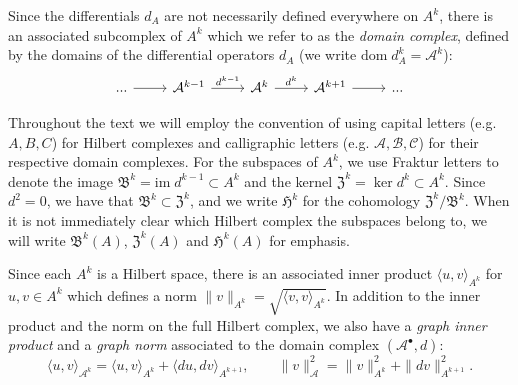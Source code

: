 \documentclass[reqno]{amsart}
\numberwithin{equation}{section}
\theoremstyle{definition}
\newcommand{\Ac}{\mathcal{A}}
\newcommand{\Bc}{\mathcal{B}}
\newcommand{\dom}{\mathrm{dom}}
\begin{document}
Since the differentials $d_A$ are not necessarily defined everywhere on $A^k$, there is an associated subcomplex of $A^k$ which we refer to as the \emph{domain complex}, defined by the domains of the differential operators $d_A$ (we write $\dom\; d^k_A = \Ac^k $):
\begin{equation}
\begin{tikzcd}
	{...} & {\mathcal{A}^{k-1}} & {\mathcal{A}^{k}} & {\mathcal{A}^{k+1}} & {...}
	\arrow[from=1-1, to=1-2]
	\arrow["{d^{k-1}}", from=1-2, to=1-3]
	\arrow["{d^k}", from=1-3, to=1-4]
	\arrow[from=1-4, to=1-5]
\end{tikzcd}
\end{equation}

Throughout the text we will employ the convention of using capital letters (e.g. $A, B, C$) for Hilbert complexes and calligraphic letters (e.g. $\Ac, \Bc, \mathcal{C}$) for their respective domain complexes. For the subspaces of $A^k$, we use Fraktur letters to denote the image $\mathfrak{B}^k = \mathrm{im} \; d^{k-1} \subset A^k$ and the kernel $\mathfrak{Z}^k = \ker d^k \subset A^k$. Since $d^2 = 0$, we have that $\mathfrak{B}^k \subset \mathfrak{Z}^k$, and we write $\mathfrak{H}^k$ for the cohomology $\mathfrak{Z}^k/\mathfrak{B}^k$. When it is not immediately clear which Hilbert complex the subspaces belong to, we will write $\mathfrak{B}^k(A)$, $\mathfrak{Z}^k(A)$ and $\mathfrak{H}^k(A)$ for emphasis. 

Since each $A^k$ is a Hilbert space, there is an associated inner product $\langle u,v \rangle_{A^k}$ for $u,v \in A^k$ which defines a norm $\|v\|_{A^k} = \sqrt{\langle v, v \rangle_{A^k}}$. In addition to the inner product and the norm on the full Hilbert complex, we also have a \emph{graph inner product} and a \emph{graph norm} associated to the domain complex $(\Ac^\bullet, d)$:
\begin{equation} \label{eq: graph ip + graph norm}
\langle u,v \rangle_{\Ac^k} = \langle u,v \rangle_{A^k} + \langle du, dv \rangle_{A^{k+1}}, \qquad \|v\|_{\Ac}^2 = \|v\|_{A^k}^2 + \|d v\|_{A^{k+1}}^2.
\end{equation}
\end{document}
